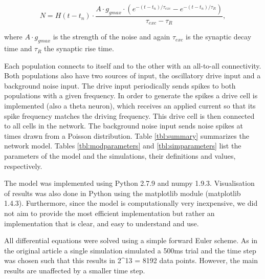 \documentclass[10pt,a4paper,onecolumn]{article}
\begin{document}
\[N=H(t-t_n) \cdot \frac{A \cdot g _{gmax} \cdot (e^{-(t-t _n)/ \tau _{exc}} - e^{-(t-t _n)/ \tau _R} )}{\tau _{exc} - \tau _R},\]

where \(A \cdot g_{gmax}\) is the strength of the noise and again
\(\tau _{exc}\) is the synaptic decay time and \(\tau_R\) the synaptic
rise time.

Each population connects to itself and to the other with an all-to-all
connectivity. Both populations also have two sources of input, the
oscillatory drive input and a background noise input. The drive input
periodically sends spikes to both populations with a given frequency. In order to generate the spikes
a drive cell is implemented (also a theta neuron), which receives an applied current so that its spike frequency
matches the driving frequency. This drive cell is then connected to all cells in the network.
The background noise input sends noise spikes at times drawn
from a Poisson distribution. Table \ref{tbl:summary} summarizes the
network model. Tables \ref{tbl:modparameters} and
\ref{tbl:simparameters} list the parameters of the model and the
simulations, their definitions and values, respectively.

The model was implemented using Python 2.7.9 and numpy 1.9.3.
Visualisation of results was also done in Python using the matplotlib
module (matplotlib 1.4.3). Furthermore, since the model is
computationally very inexpensive, we did not aim to provide the most
efficient implementation but rather an implementation that is clear, and
easy to understand and use.

All differential equations were solved using a simple forward Euler
scheme. As in the original article a single simulation simulated a 500ms
trial and the time step was chosen such that this results in 2\^{}13 =
8192 data points. However, the main results are unaffected by a smaller
time step.
\end{document}
